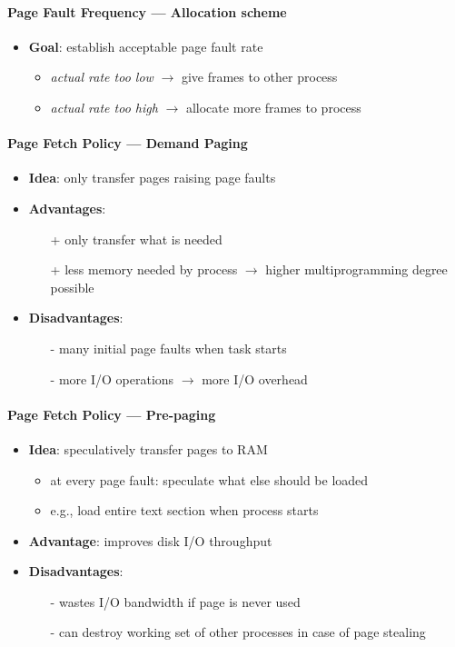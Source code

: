 \paragraph{Page Fault Frequency --- Allocation scheme}
\begin{itemize}
  \item \textbf{Goal}: establish acceptable page fault rate
  \begin{itemize}
    \item \emph{actual rate too low} $ \to $ give frames to other process
    \item \emph{actual rate too high} $ \to $ allocate more frames to process
  \end{itemize}
\end{itemize}

\paragraph{Page Fetch Policy --- Demand Paging}
\begin{itemize}
  \item \textbf{Idea}: only transfer pages raising page faults
  \item \textbf{Advantages}:
  \begin{itemize}
    \item[+] only transfer what is needed
    \item[+] less memory needed by process $ \to $ higher multiprogramming degree possible
  \end{itemize}
  \item \textbf{Disadvantages}:
  \begin{itemize}
    \item[-] many initial page faults when task starts
    \item[-] more I/O operations $ \to $ more I/O overhead
  \end{itemize}
\end{itemize}

\paragraph{Page Fetch Policy --- Pre-paging}
\begin{itemize}
  \item \textbf{Idea}: speculatively transfer pages to RAM
  \begin{itemize}
    \item at every page fault: speculate what else should be loaded
    \item e.g., load entire text section when process starts
  \end{itemize}
  \item \textbf{Advantage}: improves disk I/O throughput
  \item \textbf{Disadvantages}:
  \begin{itemize}
    \item[-] wastes I/O bandwidth if page is never used
    \item[-] can destroy working set of other processes in case of page stealing
  \end{itemize}
\end{itemize}

